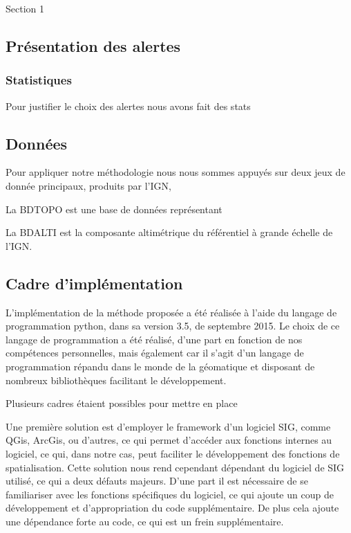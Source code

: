 Section 1



\subsection{Présentation des alertes}

\subsubsection{Statistiques}

Pour justifier le choix des alertes nous avons fait des stats 

\subsection{Données}

Pour appliquer notre méthodologie nous nous sommes appuyés sur deux
jeux de donnée principaux, produits par l'IGN,

La BDTOPO est une base de données représentant

La BDALTI est la composante altimétrique du référentiel à grande
échelle de l'IGN.

\subsection{Cadre d'implémentation}

L'implémentation de la méthode proposée a été réalisée à l'aide du
langage de programmation python, dans sa version 3.5, de septembre
2015. Le choix de ce langage de programmation a été réalisé, d'une
part en fonction de nos compétences personnelles, mais également car
il s'agit d'un langage de programmation répandu dans le monde de la
géomatique et disposant de nombreux bibliothèques facilitant le
développement.

Plusieurs cadres étaient possibles pour mettre en place

Une première solution est d'employer le framework d'un logiciel SIG,
comme QGis, ArcGis, ou d'autres, ce qui permet d’accéder aux fonctions
internes au logiciel, ce qui, dans notre cas, peut faciliter le
développement des fonctions de spatialisation. Cette solution nous
rend cependant dépendant du logiciel de SIG utilisé, ce qui a deux
défauts majeurs. D'une part il est nécessaire de se familiariser avec
les fonctions spécifiques du logiciel, ce qui ajoute un coup de
développement et d'appropriation du code supplémentaire. De plus cela
ajoute une dépendance forte au code, ce qui est un frein
supplémentaire.

